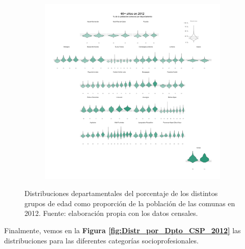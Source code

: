 \begin{figure}[h]
\begin{subfigure}{0.3\textwidth}
	\end{subfigure}
	~
	\begin{subfigure}{0.3\textwidth}
	\includegraphics[width = \textwidth]{Figs/AED/Geofacet_Distr_por_Dpto_Ed6_2012}
	\end{subfigure}
	\caption{Distribuciones departamentales del porcentaje de los distintos grupos de edad como proporción de la población de las comunas en 2012. Fuente: elaboración propia con los datos censales.}
	\label{fig:Distr_por_Dpto_Edades_2012}	
\end{figure}

Finalmente, vemos en la \textbf{Figura \ref{fig:Distr_por_Dpto_CSP_2012}} las distribuciones para las diferentes categorías socioprofesionales.\\

